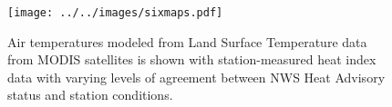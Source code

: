 \documentclass{ametsoc}
\begin{document}
\begin{center}
\begin{figure}[t]
 \texttt{[image: ../../images/sixmaps.pdf]}
  \caption{Air temperatures modeled from Land Surface Temperature data from MODIS satellites is shown with station-measured heat index data with varying levels of agreement between NWS Heat Advisory status and station conditions. }
   \label{fig:LSTairTemps}
\end{figure}
\end{center}
\end{document}
